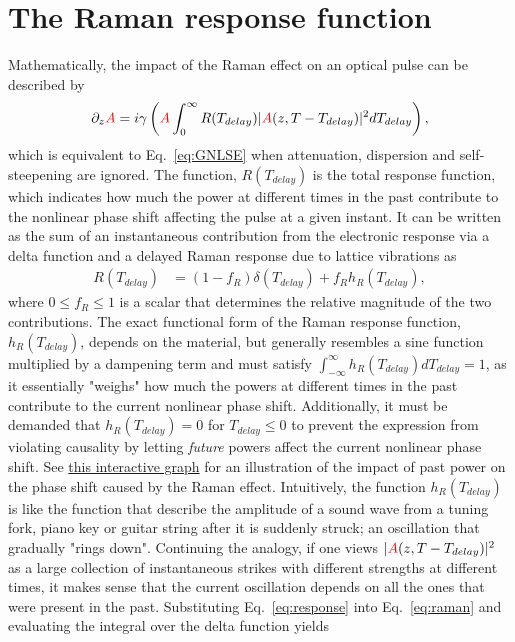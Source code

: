 \section{The Raman response function}
Mathematically, the impact of the Raman effect on an optical pulse can be described by
\begin{align}
\label{eq:raman}
 \partial_z \textcolor{red}{A} = i\gamma\left( 
\textcolor{red}{A} \int_{0}^{\infty} R(T_{delay})|\textcolor{red}{A}(z,T-T_{delay})|^2 dT_{delay} \right),
\end{align}
which is equivalent to Eq.~\ref{eq:GNLSE} when attenuation, dispersion and self-steepening are ignored. The function, $R(T_{delay})$ is the total response function, which indicates how much the power at different times in the past contribute to the nonlinear phase shift affecting the pulse at a given instant. It can be written as the sum of an instantaneous contribution from the electronic response via a delta function and a delayed Raman response due to lattice vibrations as
\begin{align}
    \label{eq:response}
    R(T_{delay})&= (1-f_R)\delta(T_{delay})+f_Rh_R(T_{delay}),
\end{align}
where $0\leq f_R\leq 1$ is a scalar that determines the relative magnitude of the two contributions. The exact functional form of the Raman response function, $h_R(T_{delay})$, depends on the material, but generally resembles a sine function multiplied by a dampening term and must satisfy $\int_{-\infty}^{\infty}h_R(T_{delay}) dT_{delay}=1$, as it essentially "weighs" how much the powers at different times in the past contribute to the current nonlinear phase shift.  Additionally, it must be demanded that $h_R(T_{delay})=0$ for $T_{delay}\leq0$ to prevent the expression from violating causality by letting \emph{future} powers affect the current nonlinear phase shift. See \href{https://www.desmos.com/calculator/bdg6icprch}{this interactive graph} for an illustration of the impact of past power on the phase shift caused by the Raman effect.
Intuitively, the function $h_R(T_{delay})$ is like the function that describe the amplitude of a sound wave from a tuning fork, piano key or guitar string after it is suddenly struck; an oscillation that gradually "rings down". Continuing the analogy, if one views $|\textcolor{red}{A}(z,T-T_{delay})|^2$ as a large collection of instantaneous strikes with different strengths at different times, it makes sense that the current oscillation depends on all the ones that were present in the past.  
Substituting Eq.~\ref{eq:response} into Eq.~\ref{eq:raman} and evaluating the integral over the delta function yields
